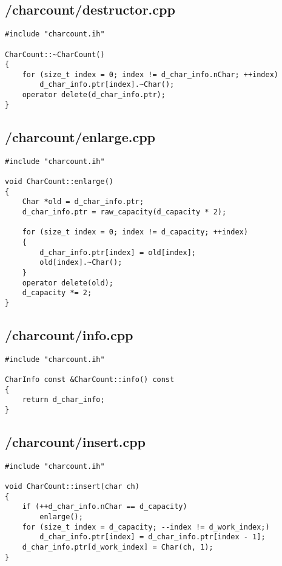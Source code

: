 \documentclass{article}
\begin{document}
\subsection*{/charcount/destructor.cpp}
\begin{verbatim}
#include "charcount.ih"

CharCount::~CharCount()
{
    for (size_t index = 0; index != d_char_info.nChar; ++index)
        d_char_info.ptr[index].~Char();
    operator delete(d_char_info.ptr);
}
\end{verbatim}
\subsection*{/charcount/enlarge.cpp}
\begin{verbatim}
#include "charcount.ih"

void CharCount::enlarge()
{
    Char *old = d_char_info.ptr;
    d_char_info.ptr = raw_capacity(d_capacity * 2);

    for (size_t index = 0; index != d_capacity; ++index)
    {
        d_char_info.ptr[index] = old[index];
        old[index].~Char();
    }
    operator delete(old);
    d_capacity *= 2;
}
\end{verbatim}
\subsection*{/charcount/info.cpp}
\begin{verbatim}
#include "charcount.ih"

CharInfo const &CharCount::info() const
{
    return d_char_info;
}
\end{verbatim}
\subsection*{/charcount/insert.cpp}
\begin{verbatim}
#include "charcount.ih"

void CharCount::insert(char ch)
{
    if (++d_char_info.nChar == d_capacity)
        enlarge();
    for (size_t index = d_capacity; --index != d_work_index;)
        d_char_info.ptr[index] = d_char_info.ptr[index - 1];
    d_char_info.ptr[d_work_index] = Char(ch, 1);
}
\end{verbatim}
\end{document}
